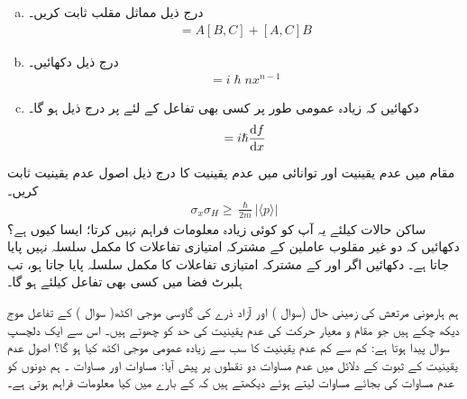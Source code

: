 \begin{enumerate}[a.]
\item
 درج ذیل مماثل  مقلب  ثابت کریں۔
\begin{align}
[ AB,C ] = A[B,C] + [A,C]B
\end{align}
\item
 درج ذیل دکھائیں۔ 
\begin{align*}
[x^{n},p] = i\hslash nx^{n-1}
\end{align*}
\item
 دکھائیں کہ زیادہ عمومی طور پر  کسی بھی تفاعل  کے لئے  پر درج ذیل ہو گا۔ 
\begin{align}
[f(x) , p] = i\hslash \frac{\dif f}{\dif x}
\end{align}
\end{enumerate}
مقام  میں عدم یقینیت اور توانائی   میں عدم یقینیت کا درج ذیل اصول  عدم یقینیت ثابت کریں۔
\begin{align*}
\sigma_{x}\sigma_{H} \geq \frac{\hslash}{2m}|\langle p \rangle |
\end{align*}
ساکن حالات کیلئے یہ آپ کو کوئی زیادہ معلومات فراہم نہیں کرتا؛ ایسا کیوں ہے؟
دکھائیں کہ دو  غیر مقلوب عاملین کے مشترکہ امتیازی  تفاعلات  کا مکمل سلسلہ نہیں پایا جاتا  ہے۔
 دکھائیں اگر  اور  کے مشترکہ امتیازی تفاعلات کا مکمل سلسلہ پایا جاتا ہو،  تب ہلبرٹ فضا میں کسی بھی تفاعل کیلئے  ہو گا۔


ہم ہارمونی مرتعش کی زمینی حال (سوال )  اور آزاد ذرے کی گاوسی موجی اکٹھ( سوال ) کے تفاعل موج دیکھ چکے ہیں جو مقام و  معیار حرکت کی عدم یقینیت کی
 حد  کو چھوتے ہیں۔ اس سے ایک دلچسپ سوال پیدا ہوتا ہے:  کم سے کم عدم یقینیت کا سب سے زیادہ عمومی موجی اکٹھ کیا ہو گا؟ اصول  عدم یقینیت  کے ثبوت کے دلائل میں عدم مساوات دو نقطوں پر پیش آیا:  مساوات  اور مساوات ۔ ہم دونوں کو عدم مساوات کی بجائے  مساوات لیتے ہوئے دیکھتے ہیں کہ   کے بارے میں کیا معلومات فراہم ہوتی ہے۔
 
